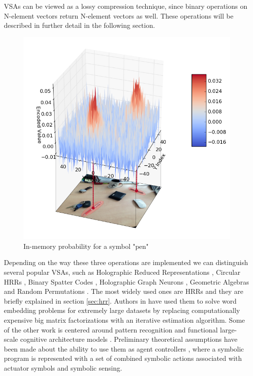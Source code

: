 \documentclass[a4paper,twoside]{article}
\begin{document}
	VSAs can be viewed as a lossy compression technique, since binary operations on N-element vectors return N-element vectors as well. These operations will be described in further detail in the following section. 
	
	\begin{figure}
		\center
		\includegraphics[width=0.9\columnwidth]{img/probe_for_pen_w_img.png}
		\caption{In-memory probability for a symbol "pen"}
	\end{figure}	
	
	Depending on the way these three operations are implemented we can distinguish several popular VSAs, such as Holographic Reduced Representations \cite{Plate:1995:HolographicReducedRepresentations}, Circular HRRs \cite{DeVine:2010:Semanticoscillations}, Binary Spatter Codes \cite{Kanerva:1994:SpatterCodeEncoding}, Holographic Graph Neurons \cite{Kleyko:2016:HolographicGraphNeuron}, Geometric Algebras \cite{Patyk-Lonska:2011:DistributedRepresentationsBased} and Random Permutations \cite{Recchia:2015:EncodingSequentialInformation}.
The most widely used ones are HRRs and they are briefly explained in section \ref{sec:hrr}.
Authors in \cite{Golosio:2015:CognitiveNeuralArchitecture} have used them to solve word embedding problems for extremely large datasets by replacing computationally expensive big matrix factorizations with an iterative estimation algorithm.
Some of the other work is centered around pattern recognition \cite{Kleyko:2016:PatternRecognitionVector} and functional large-scale cognitive architecture models \cite{Eliasmith:2012:LargeScaleModel}.
Preliminary theoretical assumptions have been made about the ability to use them as agent controllers \cite{Levy:2013:LearningBehaviorHierarchies}, where a symbolic program is represented with a set of combined symbolic actions associated with actuator symbols and symbolic sensing.
		
\end{document}
